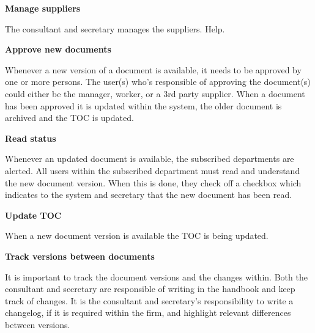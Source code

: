 \textbf{Manage suppliers}

The consultant and secretary manages the suppliers. Help.

\textbf{Approve new documents}

Whenever a new version of a document is available, it needs to be approved by one or more persons. 
The user(s) who’s responsible of approving the document(s) could either be the manager, worker, or a 3rd party supplier. 
When a document has been approved it is updated within the system, the older document is archived and the TOC is updated.

\textbf{Read status}

Whenever an updated document is available, the subscribed departments are alerted. 
All users within the subscribed department must read and understand the new document version. 
When this is done, they check off a checkbox which indicates to the system and secretary that the new document has been read.


\textbf{Update TOC}

When a new document version is available the TOC is being updated.

\textbf{Track versions between documents}

It is important to track the document versions and the changes within. 
Both the consultant and secretary are responsible of writing in the handbook and keep track of changes. 
It is the consultant and secretary’s responsibility to write a changelog, if it is required within the firm, and highlight relevant differences between versions.

